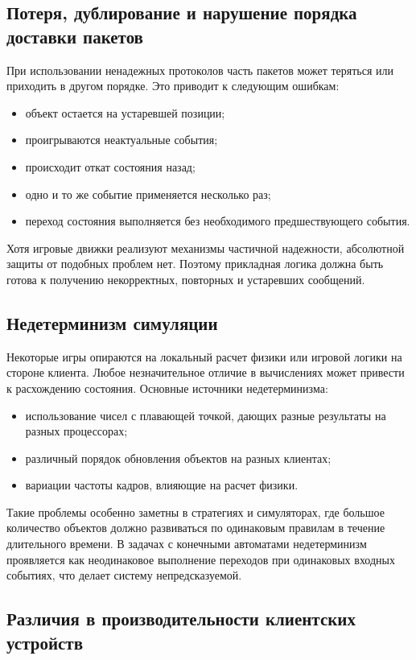 \subsection{Потеря, дублирование и нарушение порядка доставки пакетов}

При использовании ненадежных протоколов часть пакетов может теряться или приходить в другом порядке. Это приводит к следующим ошибкам:
\begin{itemize}
	\item объект остается на устаревшей позиции;
	\item проигрываются неактуальные события;
	\item происходит откат состояния назад;
	\item одно и то же событие применяется несколько раз;
	\item переход состояния выполняется без необходимого предшествующего события.
\end{itemize}

Хотя игровые движки реализуют механизмы частичной надежности, абсолютной защиты от подобных проблем нет. Поэтому прикладная логика должна быть готова к получению некорректных, повторных и устаревших сообщений.

\subsection{Недетерминизм симуляции}

Некоторые игры опираются на локальный расчет физики или игровой логики на стороне клиента. Любое незначительное отличие в вычислениях может привести к расхождению состояния. Основные источники недетерминизма:
\begin{itemize}
	\item использование чисел с плавающей точкой, дающих разные результаты на разных процессорах;
	\item различный порядок обновления объектов на разных клиентах;
	\item вариации частоты кадров, влияющие на расчет физики.
\end{itemize}

Такие проблемы особенно заметны в стратегиях и симуляторах, где большое количество объектов должно развиваться по одинаковым правилам в течение длительного времени. В задачах с конечными автоматами недетерминизм проявляется как неодинаковое выполнение переходов при одинаковых входных событиях, что делает систему непредсказуемой.

\subsection{Различия в производительности клиентских устройств}

